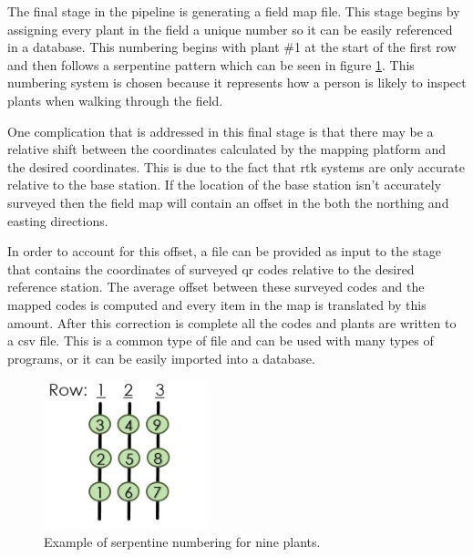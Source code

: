 The final stage in the pipeline is generating a field map file.  This stage begins by assigning every plant in the field a unique number so it can be easily referenced in a database.  This numbering begins with plant \#1 at the start of the first row and then follows a serpentine pattern which can be seen in figure \ref{figure:serpentine}. This numbering system is chosen because it represents how a person is likely to inspect plants when walking through the field.  

One complication that is addressed in this final stage is that there may be a relative shift between the coordinates calculated by the mapping platform and the desired coordinates.  This is due to the fact that \ac{rtk} systems are only accurate relative to the base station.  If the location of the base station isn't accurately surveyed then the field map will contain an offset in the both the northing and easting directions. 

In order to account for this offset, a file can be provided as input to the stage that contains the coordinates of surveyed \ac{qr} codes relative to the desired reference station.  The average offset between these surveyed codes and the mapped codes is computed and every item in the map is translated by this amount. After this correction is complete all the codes and plants are written to a \ac{csv} file.  This is a common type of file and can be used with many types of programs, or it can be easily imported into a database.

\begin{figure}
	\centering
    \includegraphics[height=1.7in]{figures/sepentine.jpg}
    \caption[Serpentine numbering]{Example of serpentine numbering for nine plants.}
    \label{figure:serpentine}
\end{figure}
